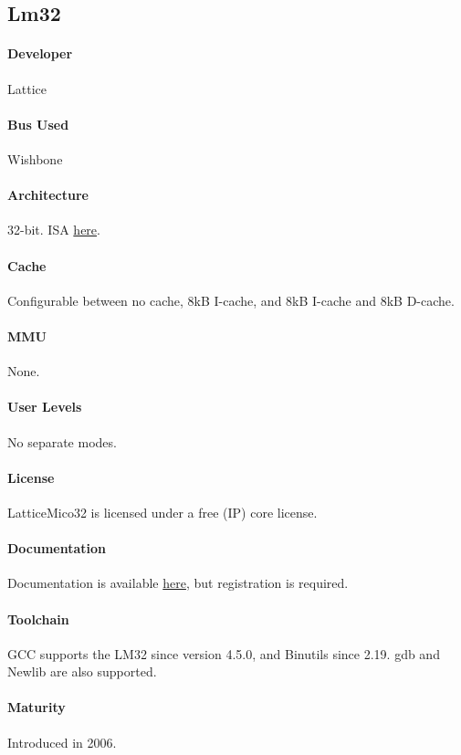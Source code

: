 \subsection{Lm32}
\paragraph{Developer} Lattice
\paragraph{Bus Used} Wishbone
\paragraph{Architecture} 32-bit. ISA \href{http://sourceware.org/cgen/gen-doc/lm32-insn.html}{here}.
\paragraph{Cache} Configurable between no cache, 8kB I-cache, and 8kB I-cache and 8kB D-cache.
\paragraph{MMU} None.
\paragraph{User Levels} No separate modes.
\paragraph{License} LatticeMico32 is licensed under a free (IP) core license.
\paragraph{Documentation} Documentation is available \href{http://www.latticesemi.com/en/Products/DesignSoftwareAndIP/IntellectualProperty/IPCore/IPCores02/LatticeMico32.aspx#_B63AC1B3E7604B0DA4F80789A0B69A31}{here}, but registration is required.
\paragraph{Toolchain} GCC supports the LM32 since version 4.5.0, and Binutils since 2.19. gdb and Newlib are also supported.
\paragraph{Maturity} Introduced in 2006.


